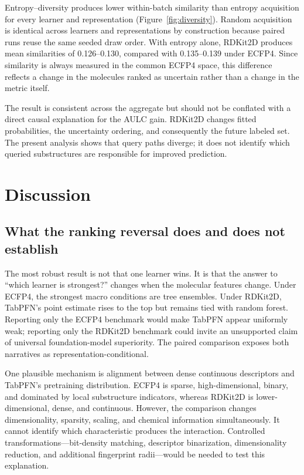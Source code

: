\documentclass[twoside,11pt]{article}
\begin{document}
Entropy--diversity produces lower within-batch similarity than entropy acquisition for every learner and representation (Figure~\ref{fig:diversity}). Random acquisition is identical across learners and representations by construction because paired runs reuse the same seeded draw order. With entropy alone, RDKit2D produces mean similarities of 0.126--0.130, compared with 0.135--0.139 under ECFP4. Since similarity is always measured in the common ECFP4 space, this difference reflects a change in the molecules ranked as uncertain rather than a change in the metric itself.

The result is consistent across the aggregate but should not be conflated with a direct causal explanation for the AULC gain. RDKit2D changes fitted probabilities, the uncertainty ordering, and consequently the future labeled set. The present analysis shows that query paths diverge; it does not identify which queried substructures are responsible for improved prediction.

\section{Discussion}
\subsection{What the ranking reversal does and does not establish}
The most robust result is not that one learner wins. It is that the answer to ``which learner is strongest?'' changes when the molecular features change. Under ECFP4, the strongest macro conditions are tree ensembles. Under RDKit2D, TabPFN's point estimate rises to the top but remains tied with random forest. Reporting only the ECFP4 benchmark would make TabPFN appear uniformly weak; reporting only the RDKit2D benchmark could invite an unsupported claim of universal foundation-model superiority. The paired comparison exposes both narratives as representation-conditional.

One plausible mechanism is alignment between dense continuous descriptors and TabPFN's pretraining distribution. ECFP4 is sparse, high-dimensional, binary, and dominated by local substructure indicators, whereas RDKit2D is lower-dimensional, dense, and continuous. However, the comparison changes dimensionality, sparsity, scaling, and chemical information simultaneously. It cannot identify which characteristic produces the interaction. Controlled transformations---bit-density matching, descriptor binarization, dimensionality reduction, and additional fingerprint radii---would be needed to test this explanation.
\end{document}
